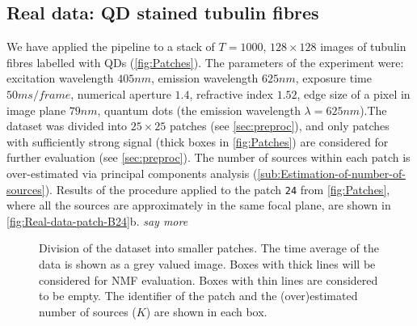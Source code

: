 \subsection{Real data: QD stained tubulin fibres\label{sub:results - tubulin}}
We have applied the pipeline to a stack of $T=1000$, $128\times128$ images of tubulin fibres labelled with QDs (\autoref{fig:Patches}). The parameters of the experiment were: excitation wavelength $405 \unit{nm}$, emission wavelength $625 \unit{nm}$, exposure time $50 \unit{ms/frame}$, numerical aperture $1.4$, refractive index $1.52$, edge size of a pixel in image plane $79 \unit{nm}$, quantum dots (the emission wavelength $\lambda=625 \unit{nm}$).The dataset was divided into $25 \times 25$ patches (see \autoref{sec:preproc}), and only patches with sufficiently strong signal (thick boxes in \autoref{fig:Patches}) are considered for further evaluation (see \autoref{sec:preproc}). The number of sources within each patch is over-estimated via principal components analysis (\autoref{sub:Estimation-of-number-of-sources}). Results of the procedure applied to the patch \texttt{24} from \autoref{fig:Patches}, where all the sources are approximately in the same focal plane, are shown in \autoref{fig:Real-data-patch-B24}b. \emph{say more} \fix

\begin{figure}[!htb]
	\centering
	
	\caption{Division of the dataset into smaller patches. The time average of the data is shown as a grey valued image. Boxes with thick lines will be considered for NMF evaluation. Boxes with thin lines are considered to be empty. The identifier of the patch and the (over)estimated number of sources ($K$) are shown in each box.}
	\label{fig:Patches}
\end{figure}


